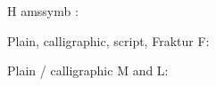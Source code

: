 \documentclass{article}
\begin{document}
\large H amssymb \texttt{\string\between}:
\par\bigskip
{}
\par\bigskip\bigskip
\large Plain, calligraphic, script, Fraktur F:
\par\bigskip
{}
\par\bigskip\bigskip
\large Plain / calligraphic M and L:
\par\bigskip
{}
\end{document}
